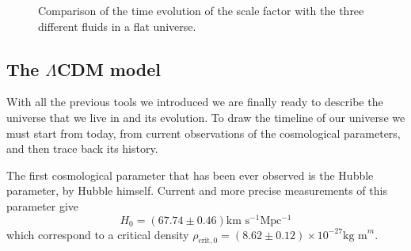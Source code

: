 \begin{figure}[h]
    \centering
    \label{fig:a_comparison}
    \caption{Comparison of the time evolution of the scale factor with the three different fluids in a flat universe.}
\end{figure}
\subsection{The $\Lambda$CDM model} 
\label{sec:LambdaCDM}
With all the previous tools we introduced we are finally ready to describe the universe that we live in and its evolution. To draw the timeline of our universe we must start from today, from current observations of the cosmological parameters, and then trace back its history.

The first cosmological parameter that has been ever observed is the Hubble parameter, by Hubble himself. Current and more precise measurements of this parameter give
$$H_0=(67.74\pm0.46)\text{km s$^{-1}$Mpc$^{-1}$}$$
which correspond to a critical density $\rho_{\text{crit},0}=(8.62\pm0.12)\times10^{-27}\text{kg m}^{m}$.

